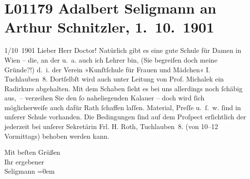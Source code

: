 

\section[Adalbert Seligmann an Arthur Schnitzler, 1. 10. 1901]{L01179 Adalbert Seligmann an Arthur Schnitzler, 1. 10. 1901}
\nopagebreak{}
\rehead{ }\normalsize\beginnumbering{}
\toendnotes[C]{\smallbreak\pagebreak[2]}
\pstart
           \raggedleft{}{\pb}1/10 1901\pend
           \vspace{0.5em}
\pstart
           Lieber Herr Doctor! Natürlich gibt es eine gute Schule für Damen in
                  Wien – die, an der u. a. auch ich Lehrer bin,
               (Sie begreifen doch meine Gründe?!) d. i. der Verein »Kunſtſchule für Frauen und Mädchen« I.
                  Tuchlauben 8. Dortſelbſt wird auch unter Leitung von Prof. Michalek ein Radirkurs abgehalten. Mit dem Schaben ſieht es
               bei uns allerdings noch ſchäbig aus, – verzeihen Sie den ſo {\pb}naheliegenden Kalauer – doch wird ſich
               möglicherweiſe auch dafür Rath ſchaffen laſſen. Material, Preſſe u. ſ. w. ſind in
               unſerer Schule vorhanden. Die Bedingungen ſind auf dem Proſpect erſichtlich der
               jederzeit bei unſerer Sekretärin Frl. H. Roth,
                  Tuchlauben 8. (von 10–12 Vormittags) behoben
               werden kann.\pend
           
\pstart
           Mit beſten Grüßen{\\[\baselineskip]}Ihr ergebener{\\[\baselineskip]}\spacefill\mbox{Seligmann}\pend
           \leftskip=0em{}\endnumbering{}  
      